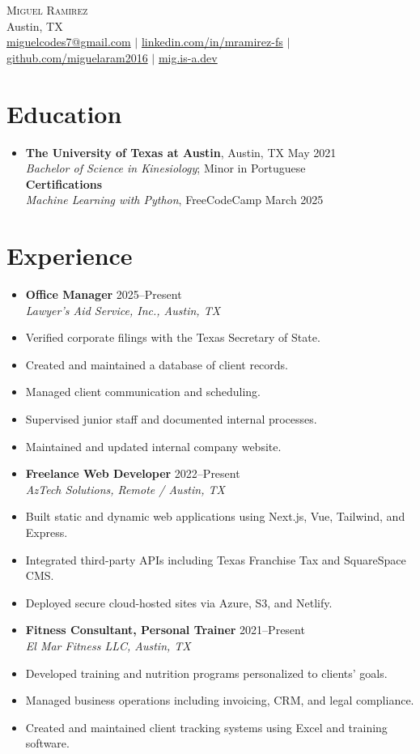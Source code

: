 \documentclass[letterpaper,10pt]{article}
\newcommand{\resumeItem}[1]{\item\small{#1}}
\newcommand{\resumeSubheading}[4]{
  \vspace{-1pt}\item
    \textbf{#1} \hfill #2 \\
    \textit{\small#3} \hfill \textit{\small #4}
}
\begin{document}
\begin{center}
  {\Huge \scshape Miguel Ramirez} \\ \vspace{1pt}
  Austin, TX \\ 
  \href{mailto:miguelcodes7@gmail.com}{miguelcodes7@gmail.com} $|$
  \href{https://linkedin.com/in/mramirez-fs}{linkedin.com/in/mramirez-fs} $|$
  \href{https://github.com/miguelaram2016}{github.com/miguelaram2016} $|$
  \href{https://mig.is-a.dev}{mig.is-a.dev}
\end{center}

\section*{Education}
\begin{itemize}[leftmargin=0.15in]
  \item[]
    \textbf{The University of Texas at Austin}, Austin, TX \hfill May 2021 \\
    \textit{Bachelor of Science in Kinesiology}; Minor in Portuguese \\

    \textbf{Certifications} \\
    \textit{Machine Learning with Python}, FreeCodeCamp \hfill March 2025 
\end{itemize}

\section*{Experience}
\begin{itemize}[leftmargin=0.15in]
  \resumeSubheading
    {Office Manager}{2025–Present}
    {Lawyer's Aid Service, Inc., Austin, TX}{}
    \resumeItem{Verified corporate filings with the Texas Secretary of State.}
    \resumeItem{Created and maintained a database of client records.}
    \resumeItem{Managed client communication and scheduling.}
    \resumeItem{Supervised junior staff and documented internal processes.}
    \resumeItem{Maintained and updated internal company website.}

  \resumeSubheading
    {Freelance Web Developer}{2022–Present}
    {AzTech Solutions, Remote / Austin, TX}{}
    \resumeItem{Built static and dynamic web applications using Next.js, Vue, Tailwind, and Express.}
    \resumeItem{Integrated third-party APIs including Texas Franchise Tax and SquareSpace CMS.}
    \resumeItem{Deployed secure cloud-hosted sites via Azure, S3, and Netlify.}

  \resumeSubheading
    {Fitness Consultant, Personal Trainer}{2021–Present}
    {El Mar Fitness LLC, Austin, TX}{}
    \resumeItem{Developed training and nutrition programs personalized to clients' goals.}
    \resumeItem{Managed business operations including invoicing, CRM, and legal compliance.}
    \resumeItem{Created and maintained client tracking systems using Excel and training software.}

\end{itemize}
\end{document}
